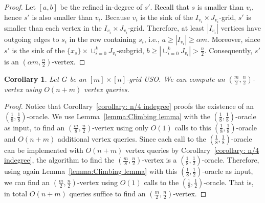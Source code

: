 \documentclass[a4paper,10pt]{article}
\newtheorem{corollary}{Corollary}
\newcommand{\indegree}{refined in-degree\xspace}
\begin{document}
\begin{proof}
Let $[a,b]$ be the \indegree of $s'$.
Recall that $s$ is smaller than $v_i$, hence $s'$ is also smaller than $v_i$.
Because $v_i$ is the sink of the $I_{v_i}\times J_{v_i}$-grid, $s'$ is smaller than each vertex in the $I_{v_i}\times J_{v_i}$-grid.
Therefore, at least $|I_{v_i}|$ vertices have outgoing edges to $s_i$ in the row containing $s_i$, i.e., $a\geq |I_{v_i}| \geq \alpha m$.
Moreover, since $s'$ is the sink of the $\{x_s\}\times \cup_{i=0}^k J_{v_i}$-subgrid, $b \geq |\cup_{i=0}^k J_{v_i}|  >  \frac{n}{2}$.
Consequently, $s'$ is an $(\alpha m,  \frac{n}{2})$-vertex.
\end{proof}

\begin{corollary}\label{corollary: (m/2,n/2) indegree}
Let $G$ be an $[m]\times [n]$-grid USO. 
We can compute an $( \frac{m}{2}, \frac{n}{2})$-vertex using $O(n + m)$ vertex queries.
\end{corollary}
\begin{proof}
Notice that Corollary~\ref{corollary: n/4 indegree} proofs the existence of an $( \frac{1}{8}, \frac{1}{8})$-oracle.
We use Lemma~\ref{lemma:Climbing lemma} with the $(\frac{1}{8}, \frac{1}{8})$-oracle as input, to find an $(\frac{m}{8}, \frac{n}{2})$-vertex using only $O(1)$ calls to this $(\frac{1}{8}, \frac{1}{8})$-oracle and $O(n+m)$ additional vertex queries. Since each call to the  $(\frac{1}{8}, \frac{1}{8})$-oracle can be implemented with $O(n+m)$ vertex queries by Corollary~\ref{corollary: n/4 indegree}, the algorithm to find the $(\frac{m}{8}, \frac{n}{2})$-vertex is a $(\frac{1}{8}, \frac{1}{2})$-oracle. 
Therefore, using again Lemma~\ref{lemma:Climbing lemma} with this $(\frac{1}{8}, \frac{1}{2})$-oracle as input, we can find an $(\frac{m}{2}, \frac{n}{2})$-vertex using $O(1)$ calls to the $(\frac{1}{8}, \frac{1}{2})$-oracle. That is, in total $O(n + m)$ queries suffice to find an $(\frac{m}{2}, \frac{n}{2})$-vertex.
\end{proof}
\end{document}
